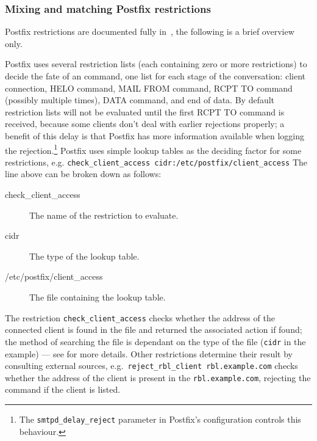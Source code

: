 \documentclass[a4paper,12pt,draft]{article}
\newcommand{\tab}[0]{%
    \hspace*{2em}%
}
\begin{document}
\subsubsection{Mixing and matching Postfix restrictions}

Postfix restrictions are documented fully in~\cite{smtpd_access_readme,
smtpd_per_user_control, policy-servers}, the following is a brief overview
only.

Postfix uses several restriction lists (each containing zero or more
restrictions) to decide the fate of an \SMTP{} command, one list for each
stage of the \SMTP{} conversation: client connection, HELO command, MAIL
FROM command, RCPT TO command (possibly multiple times), DATA command, and
end of data.  By default restriction lists will not be evaluated until the
first RCPT TO command is received, because some clients don't deal with
earlier rejections properly; a benefit of this delay is that Postfix has
more information available when logging the rejection.\footnote{The
\texttt{smtpd\_delay\_reject} parameter in Postfix's configuration controls
this behaviour.}  Postfix uses simple lookup tables as the deciding factor
for some restrictions, e.g.\newline
\tab{}\texttt{check\_client\_access~cidr:/etc/postfix/client\_access}
\newline The line above can be broken down as follows:

\begin{description}

    \item [check\_client\_access] The name of the restriction to evaluate.

    \item [cidr] The type of the lookup table.

    \item [/etc/postfix/client\_access] The file containing the lookup
        table.

\end{description}

The restriction \texttt{check\_client\_access} checks whether the \IP{}
address of the connected client is found in the file and returned the
associated action if found; the method of searching the file is dependant
on the type of the file (\texttt{cidr} in the example) --- see
\cite{postfix-lookup-tables} for more details.  Other restrictions
determine their result by consulting external sources, e.g.\
\texttt{reject\_rbl\_client rbl.example.com} checks whether the \IP{}
address of the client is present in the \RBL{} \texttt{rbl.example.com},
rejecting the command if the client is listed.
\end{document}
